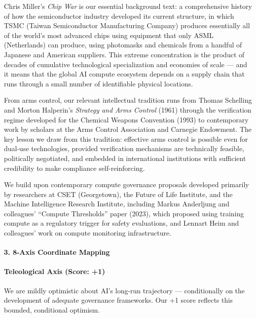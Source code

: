 Chris Miller's \emph{Chip War} is our essential background text: a
comprehensive history of how the semiconductor industry developed its
current structure, in which TSMC (Taiwan Semiconductor Manufacturing
Company) produces essentially all of the world's most advanced chips
using equipment that only ASML (Netherlands) can produce, using
photomasks and chemicals from a handful of Japanese and American
suppliers. This extreme concentration is the product of decades of
cumulative technological specialization and economies of scale --- and
it means that the global AI compute ecosystem depends on a supply chain
that runs through a small number of identifiable physical locations.

From arms control, our relevant intellectual tradition runs from Thomas
Schelling and Morton Halperin's \emph{Strategy and Arms Control} (1961)
through the verification regime developed for the Chemical Weapons
Convention (1993) to contemporary work by scholars at the Arms Control
Association and Carnegie Endowment. The key lesson we draw from this
tradition: effective arms control is possible even for dual-use
technologies, provided verification mechanisms are technically feasible,
politically negotiated, and embedded in international institutions with
sufficient credibility to make compliance self-reinforcing.

We build upon contemporary compute governance proposals developed
primarily by researchers at CSET (Georgetown), the Future of Life
Institute, and the Machine Intelligence Research Institute, including
Markus Anderljung and colleagues' ``Compute Thresholds'' paper (2023),
which proposed using training compute as a regulatory trigger for safety
evaluations, and Lennart Heim and colleagues' work on compute monitoring
infrastructure.

\paragraph{3. 8-Axis Coordinate
Mapping}\label{axis-coordinate-mapping-8}

\paragraph{Teleological Axis (Score:
+1)}\label{teleological-axis-score-1}

We are mildly optimistic about AI's long-run trajectory ---
conditionally on the development of adequate governance frameworks. Our
+1 score reflects this bounded, conditional optimism.

